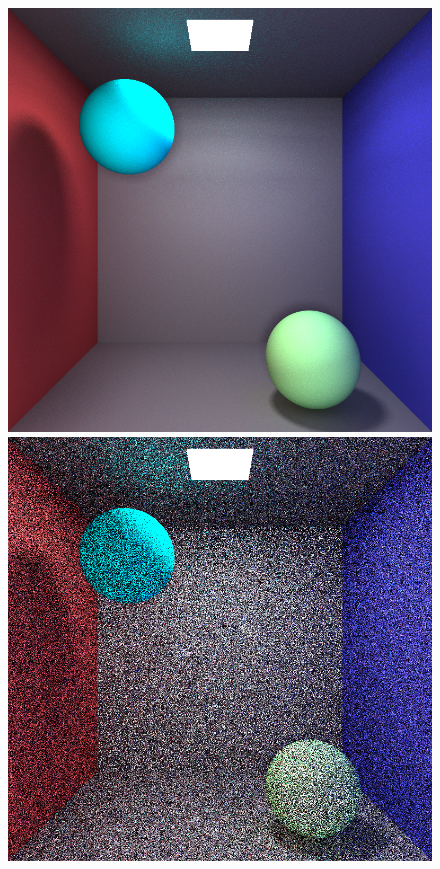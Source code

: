 \documentclass[UTF8]{ctexart}
\begin{document}
    \begin{figure}[htbp]
        \centering
        \begin{minipage}[c]{0.45\textwidth}
            \centering
            \includegraphics[width=\textwidth]{img/PT_NEE.png}
        \end{minipage}
        \begin{minipage}[c]{0.45\textwidth}
            \centering
            \includegraphics[width=\textwidth]{img/PT_BASIC.png}
        \end{minipage}
    \end{figure}
\end{document}

